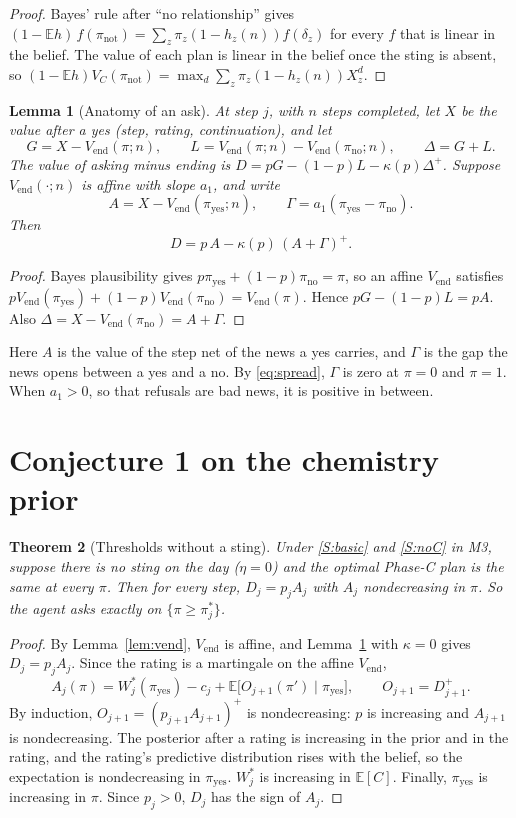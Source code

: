 \documentclass[11pt,a4paper]{article}
\newcommand{\E}{\mathbb{E}}
\newtheorem{theorem}{Theorem}
\newtheorem{lemma}[theorem]{Lemma}
\theoremstyle{definition}
\theoremstyle{remark}
\newcommand{\Vend}{V_{\mathrm{end}}}
\newcommand{\py}{\pi_{\mathrm{yes}}}
\newcommand{\pn}{\pi_{\mathrm{no}}}
\begin{document}
\begin{proof}
Bayes' rule after ``no relationship'' gives $(1-\E h)\,f(\pi_{\mathrm{not}})=\sum_z\pi_z(1-h_z(n))f(\delta_z)$ for every $f$ that is linear in the belief. The value of each plan is linear in the belief once the sting is absent, so $(1-\E h)V_C(\pi_{\mathrm{not}})=\max_d\sum_z\pi_z(1-h_z(n))X^d_z$.
\end{proof}

\begin{lemma}[Anatomy of an ask]\label{lem:anat}
At step $j$, with $n$ steps completed, let $X$ be the value after a yes (step, rating, continuation), and let
\[
G=X-\Vend(\pi;n),\qquad L=\Vend(\pi;n)-\Vend(\pn;n),\qquad \Delta=G+L.
\]
The value of asking minus ending is $D=pG-(1-p)L-\kappa(p)\Delta^+$. Suppose $\Vend(\cdot;n)$ is affine with slope $a_1$, and write
\[
A=X-\Vend(\py;n),\qquad \Gamma=a_1(\py-\pn).
\]
Then
\begin{equation}\label{eq:anat}
D=p\,A-\kappa(p)\,(A+\Gamma)^+ .
\end{equation}
\end{lemma}

\begin{proof}
Bayes plausibility gives $p\py+(1-p)\pn=\pi$, so an affine $\Vend$ satisfies $p\Vend(\py)+(1-p)\Vend(\pn)=\Vend(\pi)$. Hence $pG-(1-p)L=pA$. Also $\Delta=X-\Vend(\pn)=A+\Gamma$.
\end{proof}

Here $A$ is the value of the step net of the news a yes carries, and $\Gamma$ is the gap the news opens between a yes and a no. By \eqref{eq:spread}, $\Gamma$ is zero at $\pi=0$ and $\pi=1$. When $a_1>0$, so that refusals are bad news, it is positive in between.

\section{Conjecture 1 on the chemistry prior}\label{sec:c1}

\begin{theorem}[Thresholds without a sting]\label{thm:c1}
Under \ref{S:basic} and \ref{S:noC} in M3, suppose there is no sting on the day ($\eta=0$) and the optimal Phase-C plan is the same at every $\pi$. Then for every step, $D_j=p_jA_j$ with $A_j$ nondecreasing in $\pi$. So the agent asks exactly on $\{\pi\ge\pi^*_j\}$.
\end{theorem}

\begin{proof}
By Lemma~\ref{lem:vend}, $\Vend$ is affine, and Lemma~\ref{lem:anat} with $\kappa=0$ gives $D_j=p_jA_j$. Since the rating is a martingale on the affine $\Vend$,
\[
A_j(\pi)=W_j^*(\py)-c_j+\E\bigl[O_{j+1}(\pi')\mid\py\bigr],\qquad O_{j+1}=D_{j+1}^+ .
\]
By induction, $O_{j+1}=(p_{j+1}A_{j+1})^+$ is nondecreasing: $p$ is increasing and $A_{j+1}$ is nondecreasing. The posterior after a rating is increasing in the prior and in the rating, and the rating's predictive distribution rises with the belief, so the expectation is nondecreasing in $\py$. $W^*_j$ is increasing in $\E[C]$. Finally, $\py$ is increasing in $\pi$. Since $p_j>0$, $D_j$ has the sign of $A_j$.
\end{proof}
\end{document}
